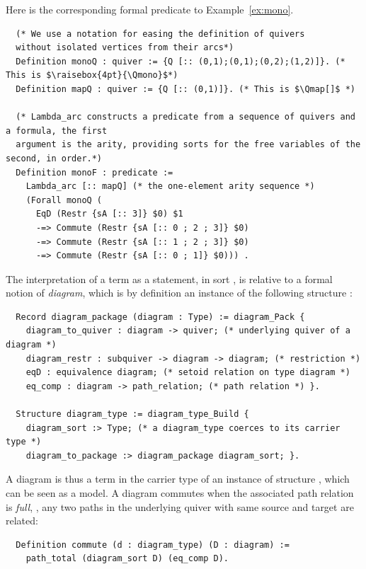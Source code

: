 \documentclass[a4paper,UKenglish,cleveref, autoref, thm-restate]{lipics-v2021}
\begin{document}
Here is the corresponding formal predicate to Example~\ref{ex:mono}.
\begin{verbatim}
  (* We use a notation for easing the definition of quivers
  without isolated vertices from their arcs*)
  Definition monoQ : quiver := {Q [:: (0,1);(0,1);(0,2);(1,2)]}. (* This is $\raisebox{4pt}{\Qmono}$*)
  Definition mapQ : quiver := {Q [:: (0,1)]}. (* This is $\Qmap[]$ *)

  (* Lambda_arc constructs a predicate from a sequence of quivers and a formula, the first
  argument is the arity, providing sorts for the free variables of the second, in order.*)
  Definition monoF : predicate :=
    Lambda_arc [:: mapQ] (* the one-element arity sequence *)
    (Forall monoQ (
      EqD (Restr {sA [:: 3]} $0) $1
      -=> Commute (Restr {sA [:: 0 ; 2 ; 3]} $0)
      -=> Commute (Restr {sA [:: 1 ; 2 ; 3]} $0)
      -=> Commute (Restr {sA [:: 0 ; 1]} $0))) .
\end{verbatim}

The interpretation of a term  as a \Coq{} statement, in sort , is relative to a formal notion of \emph{diagram}, which is by definition an instance of the following structure :
\begin{verbatim}
  Record diagram_package (diagram : Type) := diagram_Pack {
    diagram_to_quiver : diagram -> quiver; (* underlying quiver of a diagram *)
    diagram_restr : subquiver -> diagram -> diagram; (* restriction *)
    eqD : equivalence diagram; (* setoid relation on type diagram *)
    eq_comp : diagram -> path_relation; (* path relation *) }.

  Structure diagram_type := diagram_type_Build {
    diagram_sort :> Type; (* a diagram_type coerces to its carrier type *)
    diagram_to_package :> diagram_package diagram_sort; }.
\end{verbatim}

A diagram is thus a term in the carrier type of an instance of structure , which can be seen as a model. A diagram commutes when the associated path relation is \emph{full}, \ie, any two paths in the underlying quiver with same source and target are related:
\begin{verbatim}
  Definition commute (d : diagram_type) (D : diagram) :=
    path_total (diagram_sort D) (eq_comp D).
\end{verbatim}
\end{document}
